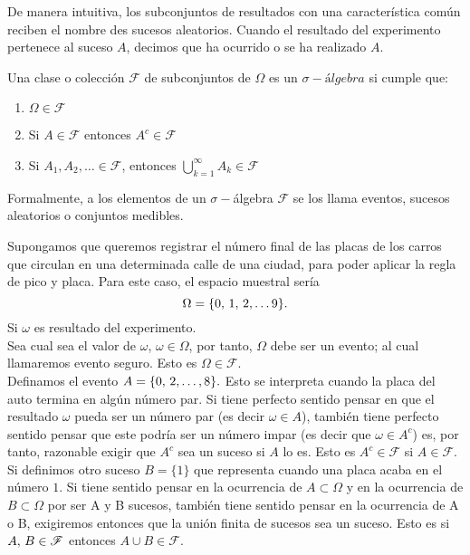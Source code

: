 De manera intuitiva, los subconjuntos de resultados con una característica común reciben el nombre des sucesos aleatorios. Cuando el resultado del experimento pertenece al suceso $A$, decimos que ha ocurrido o se ha realizado $A$.
\begin{Def}
    Una clase o colección $\mathscr{F}$ de subconjuntos de $\Omega$ es un $\sigma- \textit{álgebra}$ si cumple que:
    \begin{enumerate}
        \item $\Omega\in\mathscr{F}$
        \item Si $A\in\mathscr{F}$ entonces $A^c\in\mathscr{F}$
        \item Si $A_1, A_2,\ldots\in\mathscr{F}$, entonces  $\bigcup_{k=1}^\infty A_k\in\mathscr{F}$
    \end{enumerate}
\end{Def}
 Formalmente, a los elementos de un $\sigma-$álgebra $\mathscr{F}$ se los llama eventos, sucesos aleatorios o conjuntos medibles.
\begin{Ejm}
    Supongamos que queremos registrar el número final de las placas de los carros que circulan en una determinada calle de una ciudad, para poder aplicar la regla de pico y placa. Para este caso, el espacio muestral sería 
    $$\Omega=\{0,\thinspace 1,\thinspace 2,\ldots 9\}.$$
    Si $\omega$ es resultado del experimento.\\
    Sea cual sea el valor de $\omega$, $\omega \in\Omega$, por tanto, $\Omega$ debe ser un evento; al cual llamaremos evento seguro. Esto es $\Omega\in\mathscr{F}.$\\ Definamos el evento $A=\{0,\thinspace 2,\ldots ,8\}.$ Esto se interpreta cuando la placa del auto termina en algún número par. Si tiene perfecto sentido pensar en que el resultado $\omega$ pueda ser un número par (es decir $\omega\in A$), también tiene perfecto sentido pensar que este podría ser un número impar (es decir que $\omega \in A^c$) es, por tanto, razonable exigir que $A^c$ sea un suceso si $A$ lo es. Esto es $A^c\in\mathscr{F}$ si $A\in\mathscr{F}.$\\Si definimos otro suceso $B=\{1\}$ que representa cuando una placa acaba en el número $1$. Si tiene sentido pensar en la ocurrencia de $A\subset\Omega $ y en la ocurrencia de $B\subset\Omega $ por ser A y B sucesos, también tiene sentido pensar en la ocurrencia de  A o B, exigiremos entonces que la unión finita de sucesos sea un suceso. Esto es si $A,\thinspace B\in\mathscr{F}$ entonces $A\cup B\in \mathscr{F}.$
\end{Ejm}
